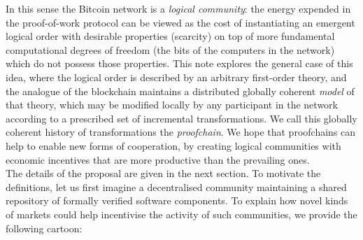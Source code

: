 \documentclass[english,letter paper,12pt,reqno]{article}
\theoremstyle{example}
\begin{document}
In this sense the Bitcoin network is a \emph{logical community}: the energy expended in the proof-of-work protocol can be viewed as the cost of instantiating an emergent logical order with desirable properties (scarcity) on top of more fundamental computational degrees of freedom (the bits of the computers in the network) which do not possess those properties. This note explores the general case of this idea, where the logical order is described by an arbitrary first-order theory, and the analogue of the blockchain maintains a distributed globally coherent \emph{model} of that theory, which may be modified locally by any participant in the network according to a prescribed set of incremental transformations. We call this globally coherent history of transformations the \emph{proofchain}. We hope that proofchains can help to enable new forms of cooperation, by creating logical communities with economic incentives that are more productive than the prevailing ones. 
\\

The details of the proposal are given in the next section. To motivate the definitions, let us first imagine a decentralised community maintaining a shared repository of formally verified software components. To explain how novel kinds of markets could help incentivise the activity of such communities, we provide the following cartoon:
\end{document}
